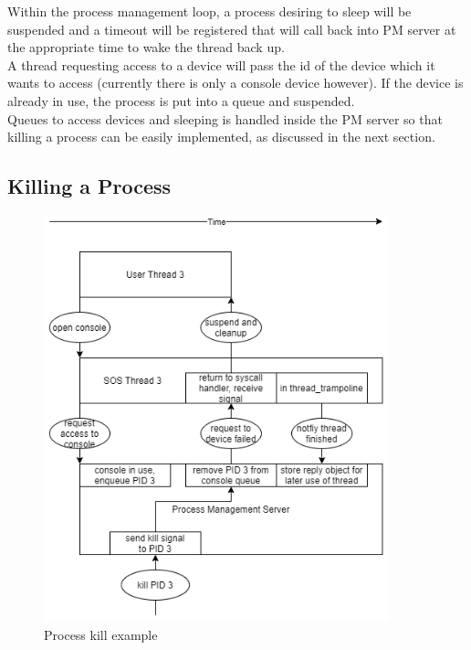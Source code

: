 \noindent
Within the process management loop, a process desiring
to sleep will be suspended and a timeout will be registered that will call
back into PM server at the appropriate time to wake the thread
back up.
\\

\noindent
A thread requesting access to a device will pass the id of the device which
it wants to access (currently there is only a console device however).
If the device is already in use, the process is put into a queue and suspended.
\\

\noindent
Queues to access devices and sleeping is handled inside the PM
server so that killing a process can be easily implemented, as discussed in
the next section.
\\

\subsection{Killing a Process}

\begin{figure}[h]
    \centering
    \includegraphics[width=100mm]{process_management_example.png}
    \caption{Process kill example}
    \label{fig:process_management}
\end{figure}

